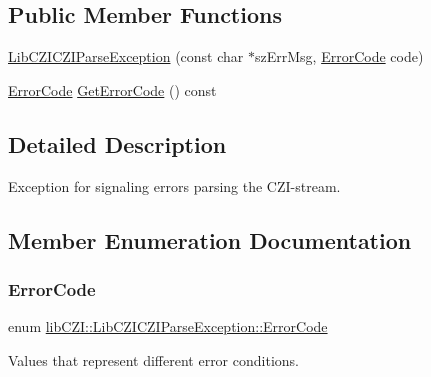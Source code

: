 \subsection*{Public Member Functions}
\begin{DoxyCompactItemize}
\item 
\hyperlink{structlib_c_z_i_1_1_lib_c_z_i_c_z_i_parse_exception_aa5278cd2edeccba4b7cf8dd8f2ff58ef}{Lib\+C\+Z\+I\+C\+Z\+I\+Parse\+Exception} (const char $\ast$sz\+Err\+Msg, \hyperlink{structlib_c_z_i_1_1_lib_c_z_i_c_z_i_parse_exception_a32a6c8ab31a657e490e5c605c97efb40}{Error\+Code} code)
\item 
\hyperlink{structlib_c_z_i_1_1_lib_c_z_i_c_z_i_parse_exception_a32a6c8ab31a657e490e5c605c97efb40}{Error\+Code} \hyperlink{structlib_c_z_i_1_1_lib_c_z_i_c_z_i_parse_exception_af9f288e1c6b3eea97729bb47b7b61f27}{Get\+Error\+Code} () const
\end{DoxyCompactItemize}


\subsection{Detailed Description}
Exception for signaling errors parsing the C\+Z\+I-\/stream. 

\subsection{Member Enumeration Documentation}
\mbox{\label{structlib_c_z_i_1_1_lib_c_z_i_c_z_i_parse_exception_a32a6c8ab31a657e490e5c605c97efb40}} 
\subsubsection{\texorpdfstring{Error\+Code}{ErrorCode}}
{\footnotesize\ttfamily enum \hyperlink{structlib_c_z_i_1_1_lib_c_z_i_c_z_i_parse_exception_a32a6c8ab31a657e490e5c605c97efb40}{lib\+C\+Z\+I\+::\+Lib\+C\+Z\+I\+C\+Z\+I\+Parse\+Exception\+::\+Error\+Code}\hspace{0.3cm}{\ttfamily [strong]}}



Values that represent different error conditions. 

